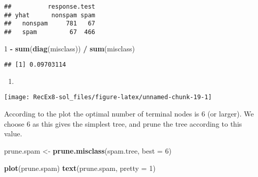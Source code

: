 \documentclass[
]{article}
\newenvironment{Shaded}{\begin{snugshade}}{\end{snugshade}}
\newcommand{\AttributeTok}[1]{\textcolor[rgb]{0.13,0.29,0.53}{#1}}
\newcommand{\DecValTok}[1]{\textcolor[rgb]{0.00,0.00,0.81}{#1}}
\newcommand{\FunctionTok}[1]{\textcolor[rgb]{0.13,0.29,0.53}{\textbf{#1}}}
\newcommand{\NormalTok}[1]{#1}
\newcommand{\OtherTok}[1]{\textcolor[rgb]{0.56,0.35,0.01}{#1}}
\newcommand{\SpecialCharTok}[1]{\textcolor[rgb]{0.81,0.36,0.00}{\textbf{#1}}}
\newcommand{\StringTok}[1]{\textcolor[rgb]{0.31,0.60,0.02}{#1}}
\providecommand{\tightlist}{%
  \setlength{\itemsep}{0pt}\setlength{\parskip}{0pt}}
\begin{document}
\begin{verbatim}
##          response.test
## yhat      nonspam spam
##   nonspam     781   67
##   spam         67  466
\end{verbatim}

\begin{Shaded}
\begin{Highlighting}[]
\DecValTok{1} \SpecialCharTok{{-}} \FunctionTok{sum}\NormalTok{(}\FunctionTok{diag}\NormalTok{(misclass)) }\SpecialCharTok{/} \FunctionTok{sum}\NormalTok{(misclass)}
\end{Highlighting}
\end{Shaded}

\begin{verbatim}
## [1] 0.09703114
\end{verbatim}

\begin{enumerate}
\def\labelenumi{\alph{enumi})}
\setcounter{enumi}{4}
\tightlist
\item
\end{enumerate}

\begin{Shaded}
\end{Shaded}

\texttt{[image: RecEx8-sol\_files/figure-latex/unnamed-chunk-19-1]}

According to the plot the optimal number of terminal nodes is 6 (or
larger). We choose 6 as this gives the simplest tree, and prune the tree
according to this value.

\begin{Shaded}
\begin{Highlighting}[]
\NormalTok{prune.spam }\OtherTok{\textless{}{-}} \FunctionTok{prune.misclass}\NormalTok{(spam.tree, }\AttributeTok{best =} \DecValTok{6}\NormalTok{)}

\FunctionTok{plot}\NormalTok{(prune.spam)}
\FunctionTok{text}\NormalTok{(prune.spam, }\AttributeTok{pretty =} \DecValTok{1}\NormalTok{)}
\end{Highlighting}
\end{Shaded}
\end{document}
